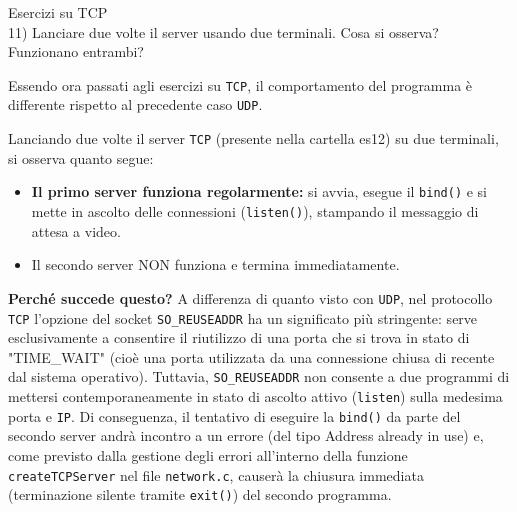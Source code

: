 \documentclass[11pt]{article}
\begin{document}
\begin{tcolorbox}[colback=blue!5!white,colframe=blue!75!black,title=\textbf{DOMANDA}, breakable]
Esercizi su TCP\\
11) Lanciare due volte il server usando due terminali. Cosa si osserva? Funzionano entrambi?
\end{tcolorbox}

\begin{tcolorbox}[colback=green!5!white,colframe=green!75!black,title=\textbf{RISPOSTA}, breakable]
Essendo ora passati agli esercizi su \texttt{TCP}, il comportamento del programma è differente rispetto al precedente caso \texttt{UDP}.

Lanciando due volte il server \texttt{TCP} (presente nella cartella es12) su due terminali, si osserva quanto segue:

\begin{itemize}
    \item \textbf{Il primo server funziona regolarmente:} si avvia, esegue il \texttt{bind()} e si mette in ascolto delle connessioni (\texttt{listen()}), stampando il messaggio di attesa a video.
    \item Il secondo server NON funziona e termina immediatamente.
\end{itemize}

\textbf{Perché succede questo?} A differenza di quanto visto con \texttt{UDP}, nel protocollo \texttt{TCP} l'opzione del socket \texttt{SO\_REUSEADDR} ha un significato più stringente: serve esclusivamente a consentire il riutilizzo di una porta che si trova in stato di "TIME\_WAIT" (cioè una porta utilizzata da una connessione chiusa di recente dal sistema operativo). Tuttavia, \texttt{SO\_REUSEADDR} non consente a due programmi di mettersi contemporaneamente in stato di ascolto attivo (\texttt{listen}) sulla medesima porta e \texttt{IP}. Di conseguenza, il tentativo di eseguire la \texttt{bind()} da parte del secondo server andrà incontro a un errore (del tipo Address already in use) e, come previsto dalla gestione degli errori all'interno della funzione \texttt{createTCPServer} nel file \texttt{network.c}, causerà la chiusura immediata (terminazione silente tramite \texttt{exit()}) del secondo programma.
\end{tcolorbox}
\end{document}
